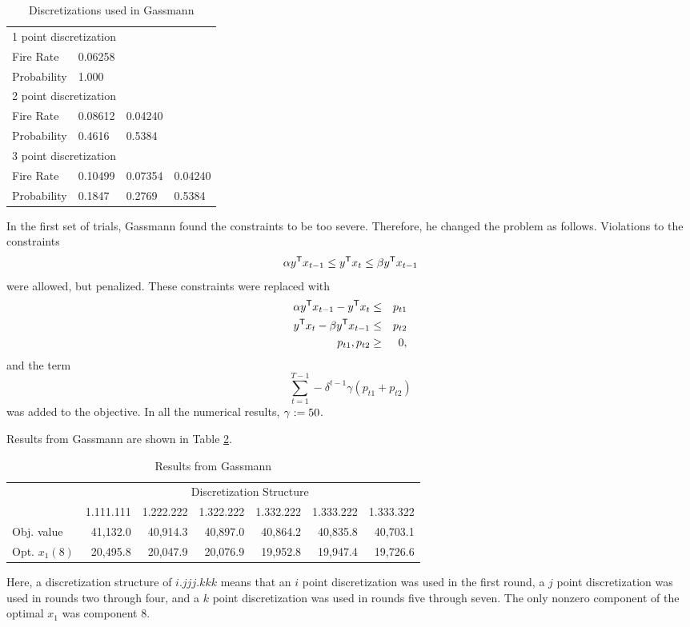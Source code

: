 \begin{table}[ht]
\caption[Discretization values used in test problems for forest management]{Discretizations used in Gassmann \cite{gassmann89}}
\label{FOREST:discretizations}
\begin{center}
\begin{tabular}{|llll|}
	\hline
	\multicolumn{4}{|l|}{1 point discretization }\\
	Fire Rate & 0.06258 & & \\
	Probability & 1.000 & & \\
	\hline
	\multicolumn{4}{|l|}{2 point discretization}\\
	Fire Rate & 0.08612 & 0.04240 &\\
	Probability & 0.4616 & 0.5384 &\\
	\hline
	\multicolumn{4}{|l|}{3 point discretization }\\
	Fire Rate & 0.10499 & 0.07354 & 0.04240\\
	Probability & 0.1847 & 0.2769 & 0.5384\\
	\hline
\end{tabular}
\end{center}
\end{table}
In the first set of trials, Gassmann \cite{gassmann89} found the constraints to be too severe.  Therefore, he changed the problem as follows.  Violations to the constraints
\[
 \alpha y^{\mbox{\scriptsize\sf T}} x_{t-1}  \leq  y^{\mbox{\scriptsize\sf T}} x_{t} \leq \beta y^{\mbox{\scriptsize\sf T}} x_{t-1}
\]
were allowed, but penalized.  These constraints were replaced with
\begin{eqnarray*}
 \alpha y^{\mbox{\scriptsize\sf T}} x_{t-1} - y^{\mbox{\scriptsize\sf T}} x_{t} &\leq& p_{t1}\\
y^{\mbox{\scriptsize\sf T}} x_{t} - \beta y^{\mbox{\scriptsize\sf T}} x_{t-1} &\leq& p_{t2}\\
p_{t1}, p_{t2} &\geq& 0,
\end{eqnarray*}
and the term 
\[
\sum_{t=1}^{T-1} -\delta^{t-1} \gamma (p_{t1} + p_{t2})
\]
was added to the objective.  In all the numerical results, $\gamma :=50$.

Results from Gassmann  \cite{gassmann89} are shown in Table \ref{FOREST:results}.
\begin{table}[ht]
\caption[Results of test problems for forest management]{Results from Gassmann  \cite{gassmann89}}
\label{FOREST:results}
\small{
\begin{tabular}{|lrrrrrr|}
\hline
&\multicolumn{6}{c|}{Discretization Structure}\\
\cline{2-7}
& 1.111.111 & 1.222.222 & 1.322.222 & 1.332.222 & 1.333.222 & 1.333.322\\
\hline
Obj. value & 41,132.0 & 40,914.3 & 40,897.0 & 40,864.2 & 40,835.8 & 40,703.1\\
Opt. $x_1(8)$ & 20,495.8 & 20,047.9 & 20,076.9 & 19,952.8 & 19,947.4 & 19,726.6\\
\hline
\end{tabular}
}
\end{table}
Here, a discretization structure of $i.jjj.kkk$ means that an $i$ point discretization was used in the first round, a $j$ point discretization was used in rounds two through four, and a $k$ point discretization was used in rounds five through seven.  The only nonzero component of the optimal $x_1$ was component $8$.  


